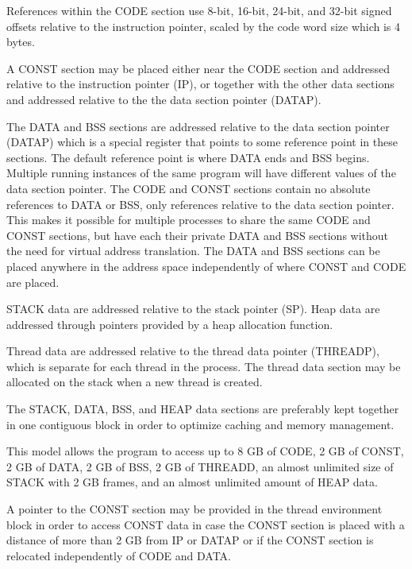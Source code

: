 \documentclass[forwardcom.tex]{subfiles}
\begin{document}
References within the CODE section use 8-bit, 16-bit, 24-bit, and 32-bit signed offsets relative to the instruction pointer, scaled by the code word size which is 4 bytes. 
\vv

A CONST section may be placed either near the CODE section and addressed relative to the instruction pointer (IP), or together with the other data sections and addressed relative to the the data section pointer (DATAP).
\vv

The DATA and BSS sections are addressed relative to the data section pointer (DATAP) which is a special register that points to some reference point in these sections. The default reference point is where DATA ends and BSS begins. Multiple running instances of the same program will have different values of the data section pointer. The CODE and CONST sections contain no absolute references to DATA or BSS, only references relative to the data section pointer. This makes it possible for multiple processes to share the same CODE and CONST sections, but have each their private DATA and BSS sections without the need for virtual address translation. The DATA and BSS sections can be placed anywhere in the address space independently of where CONST and CODE are placed.
\vv

STACK data are addressed relative to the stack pointer (SP). Heap data are addressed through pointers provided by a heap allocation function. 
\vv

Thread data are addressed relative to the thread data pointer (THREADP), which is separate for each thread in the process. The thread data section may be allocated on the stack when a new thread is created.
\vv

The STACK, DATA, BSS, and HEAP data sections are preferably kept together in one contiguous block in order to optimize caching and memory management. 
\vv

This model allows the program to access up to 8 GB of CODE, 2 GB of CONST, 2 GB of DATA, 2 GB of BSS, 2 GB of THREADD, an almost unlimited size of STACK with 2 GB frames, and an almost unlimited amount of HEAP data. 
\vv

A pointer to the CONST section may be provided in the thread environment block in order to access CONST data in case  the CONST section is placed with a distance of more than 2 GB from IP or DATAP or if the CONST section is relocated independently of CODE and DATA.
\vv
\end{document}
